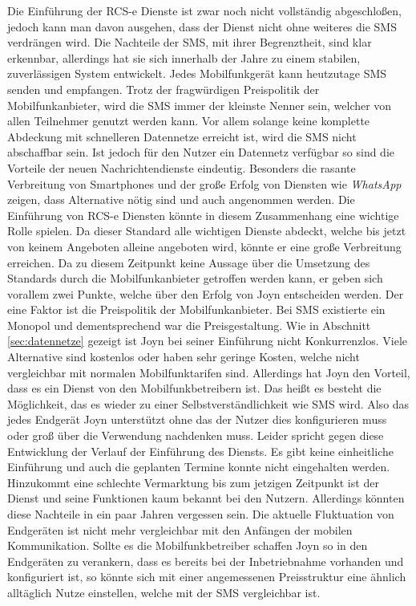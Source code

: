 \documentclass[german,12pt,a4paper]{article}
\begin{document}
Die Einführung der RCS-e Dienste ist zwar noch nicht vollständig abgeschloßen, jedoch
kann man davon ausgehen, dass der Dienst nicht ohne weiteres die SMS verdrängen wird. Die
Nachteile der SMS, mit ihrer Begrenztheit, sind klar erkennbar, allerdings hat sie sich innerhalb
der Jahre zu einem stabilen, zuverlässigen System entwickelt. Jedes Mobilfunkgerät kann
heutzutage SMS senden und empfangen. Trotz der fragwürdigen Preispolitik der Mobilfunkanbieter,
wird die SMS immer der kleinste Nenner sein, welcher von allen Teilnehmer genutzt werden kann.
Vor allem solange keine komplette Abdeckung mit schnelleren Datennetze erreicht ist, wird die
SMS nicht abschaffbar sein. Ist jedoch für den Nutzer ein Datennetz verfügbar so sind die
Vorteile der neuen Nachrichtendienste eindeutig. Besonders die rasante Verbreitung von
Smartphones und der große Erfolg von Diensten wie \textit{WhatsApp} zeigen, dass
Alternative nötig sind und auch angenommen werden. Die Einführung von RCS-e Diensten könnte in
diesem Zusammenhang eine wichtige Rolle spielen. Da dieser Standard alle wichtigen Dienste
abdeckt, welche bis jetzt von keinem Angeboten alleine angeboten wird, könnte er eine große
Verbreitung erreichen. Da zu diesem Zeitpunkt keine Aussage über die Umsetzung des Standards
durch die Mobilfunkanbieter getroffen werden kann, er geben sich vorallem zwei Punkte, welche über
den Erfolg von Joyn entscheiden werden. Der eine Faktor ist die Preispolitik der
Mobilfunkanbieter. Bei SMS existierte ein Monopol und dementsprechend war die Preisgestaltung. Wie
in Abschnitt \ref{sec:datennetze} gezeigt ist Joyn bei seiner Einführung nicht Konkurrenzlos.
Viele Alternative sind kostenlos oder haben sehr geringe Kosten, welche nicht vergleichbar mit
normalen Mobilfunktarifen sind. Allerdings hat Joyn den Vorteil, dass es ein Dienst von den
Mobilfunkbetreibern ist. Das heißt es besteht die Möglichkeit, das es wieder zu einer
Selbstverständlichkeit wie SMS wird. Also das jedes Endgerät Joyn unterstützt ohne das der Nutzer
dies konfigurieren muss oder groß über die Verwendung nachdenken muss. Leider spricht gegen diese
Entwicklung der Verlauf der Einführung des Diensts. Es gibt keine einheitliche Einführung und auch
die geplanten Termine konnte nicht eingehalten werden. Hinzukommt eine schlechte Vermarktung bis zum
jetzigen Zeitpunkt ist der Dienst und seine Funktionen kaum bekannt bei den Nutzern. Allerdings
könnten diese Nachteile in ein paar Jahren vergessen sein. Die aktuelle Fluktuation von Endgeräten
ist nicht mehr vergleichbar mit den Anfängen der mobilen Kommunikation. Sollte es die
Mobilfunkbetreiber schaffen Joyn so in den Endgeräten zu verankern, dass es bereits bei der
Inbetriebnahme vorhanden und konfiguriert ist, so könnte sich mit einer angemessenen Preisstruktur
eine ähnlich alltäglich Nutze einstellen, welche mit der SMS vergleichbar ist.


\clearpage

\end{document}

